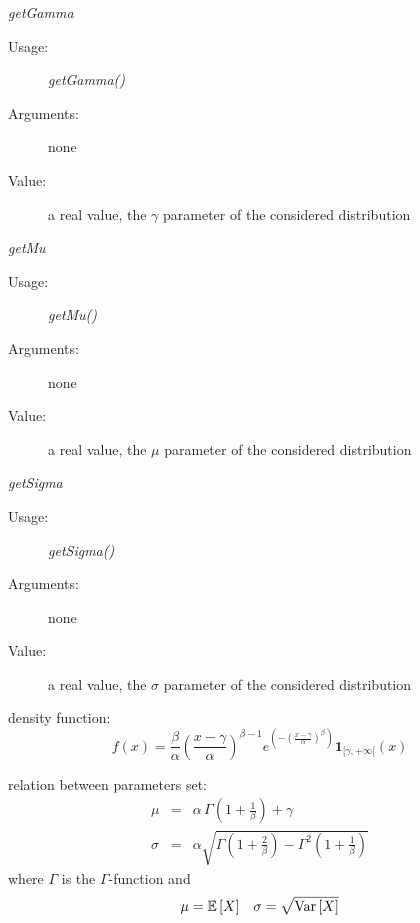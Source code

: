 \begin{description}
\begin{description}
\item \textit{getGamma}
\begin{description}
\item[Usage:] \textit{getGamma()}
\item[Arguments:] none
\item[Value:]  a real value, the $\gamma$ parameter of the considered distribution
\end{description}
\bigskip

\item \textit{getMu}
\begin{description}
\item[Usage:] \textit{getMu()}
\item[Arguments:] none
\item[Value:]  a real value,  the $\mu$ parameter of the considered distribution
\end{description}
\bigskip
\item \textit{getSigma}
\begin{description}
\item[Usage:] \textit{getSigma()}
\item[Arguments:] none
\item[Value:]  a real value,  the $\sigma$ parameter of the considered distribution
\end{description}
\bigskip
\end{description}

\item[Details:]  \rule{0pt}{1em}
\begin{description}
\item density function:
\begin{equation}
f(x) =
\frac{\beta}{\alpha}
\left(
\frac{x-\gamma}{\alpha}
\right)^{\beta-1}
e^{
\left(
- \left(
\frac{x-\gamma}{\alpha}
\right)^{\beta}
\right)}
\boldsymbol{1}_{[\gamma,+\infty[}(x)
\end{equation}


\item relation between parameters set:
\begin{eqnarray*}
\mu                       &       =       & \alpha \,\Gamma\left(1+\frac{1}{\beta}\right) + \gamma        \\
\sigma            &  =    &        \alpha \sqrt{\Gamma\left(1+\frac{2}{\beta}\right) -  \Gamma^2 \left(1+\frac{1}{\beta}\right)}
\end{eqnarray*}
where $\Gamma$ is the $\Gamma$-function and
\begin{align*}
\mu = {\mathbb E}\left[ X \right]
&&
\sigma = \sqrt{{\rm Var}\left[ X \right] }
\end{align*}
\end{description}

\item[Links:]  \rule{0pt}{1em}
\end{description}

